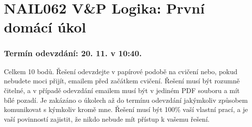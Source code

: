 \documentclass[a4paper,12pt]{article}
\begin{document}
\section*{NAIL062 V\&P Logika: První domácí  úkol}

\subsubsection*{Termín odevzdání: 20. 11. v 10:40.}
Celkem 10 bodů. Řešení odevzdejte v papírové podobě na cvičení nebo, pokud nebudete moci přijít, emailem před začátkem cvičení. Řešení musí být rozumně čitelné, a v případě odevzdání emailem musí být v jediném PDF souboru a mít bílé pozadí. Je zakázáno o úkolech až do termínu odevzdání jakýmkoliv způsobem komunikovat s kýmkoliv kromě mne. Řešení musí být 100\% vaší vlastní prací, a je vaší povinností zajistit, že nikdo nebude mít přístup k vašemu řešení.

\bigskip
\end{document}

